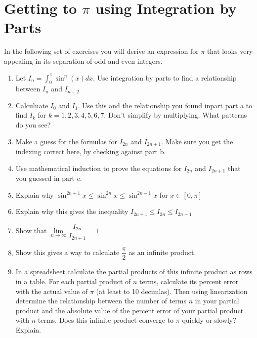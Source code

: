 \documentclass{amsbook}
\begin{document}
    \section*{Getting to $\pi$ using Integration by Parts}
    In the following set of exercises you will derive an expression for $\pi$ that looks very appealing in its separation of odd and even integers.\\
    \begin{enumerate}
	\item Let $I_n =\displaystyle \int_0^\pi \sin^n(x)dx$. Use integration by parts to find a relationship between $I_n$ and $I_{n-2}$\\
	\item Calculuate $I_0$ and $I_1$.  Use this and the relationship you found inpart part a to find $I_k$ for $k=1, 2, 3, 4, 5, 6, 7$.  Don't simplify by multiplying. What patterns do you see?
	\item Make a guess for the formulas for $I_{2n}$ and $I_{2n+1}$. Make sure you get the indexing correct here, by checking against part b.
	\item Use mathematical induction to prove the equations for $I_{2n}$ and $I_{2n+1}$ that you guessed in part c. 
	\item Explain why $\sin^{2n+1}x \leq \sin^{2n}x \leq \sin^{2n-1} x$ for $x \in [0,\pi]$
	\item Explain why this gives the inequality $I_{2n+1} \leq I_{2n} \leq I_{2n-1}$
	\item Show that $\lim\limits_{n \to \infty} \dfrac{I_{2n}}{I_{2n+1}} =1$
	\item Show this gives a way to calculate $\dfrac{\pi}{2}$ as an infinite product. 
	\item In a spreadsheet calculate the partial products of this infinite product as rows in a table. For each partial product of $n$ terms, calculate its percent error with the actual value of $\pi$ (at least to 10 decimlas).  Then using linearization determine the relationship between the number of terms $n$ in your partial product and the absolute value of the percent error of your partial product with $n$ terms. Does this infinite product converge to $\pi$ quickly or slowly? Explain.
	\end{enumerate}

\newpage	    
\end{document}
